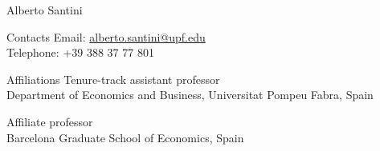 \documentclass[12pt]{article}
\newcommand{\cvImportant}[1]{\textcolor{cvblue}{#1}}
\begin{document}
  

  {\huge\TitleFont Alberto Santini}

  \vspace{2em}

  \begin{paracol}{2}
    {\TitleFont Contacts}
  \switchcolumn
    Email: \href{mailto:alberto.santini@upf.edu}{alberto.santini@upf.edu}\\
    Telephone: +39 388 37 77 801
  \end{paracol}

  \vspace{0.5em}

  \begin{paracol}{2}
    {\TitleFont Affiliations}
  \switchcolumn
    \cvImportant{Tenure-track assistant professor}\\
    Department of Economics and Business, Universitat Pompeu Fabra, Spain
    
    \cvImportant{Affiliate professor}\\
    Barcelona Graduate School of Economics, Spain
  \end{paracol}

  
  
  
  
  
  
  
  
  
\end{document}
